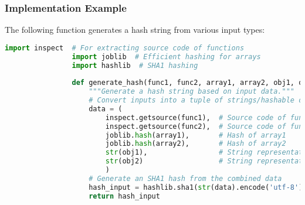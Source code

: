\documentclass{article}
\begin{document}
			\begin{comment}
			
			\subsubsection{The Concept of Hashing Input Data}
			
			The goal is to create a hash that uniquely represents simulation inputs:
			\begin{itemize}
				\item \textbf{Functions:} Use their source code as part of the hash (noting limitations for closures and dynamically defined functions).
				\item \textbf{Arrays:} Use efficient hashing methods like \texttt{joblib.hash} to avoid lengthy string conversions.
				\item \textbf{Objects:} Use string representations via \texttt{str()}, sufficient for smaller objects.
			\end{itemize}
			The resulting hash string can be used to:
			\begin{itemize}
				\item Name files or directories for storing simulation results.
				\item Check whether a previously computed result exists.
			\end{itemize}
				content...
			\end{comment}
			
			\subsubsection{Implementation Example}
			
			The following function generates a hash string from various input types:
			
			\begin{lstlisting}[language=Python]
				import inspect  # For extracting source code of functions
				import joblib  # Efficient hashing for arrays
				import hashlib  # SHA1 hashing
				
				def generate_hash(func1, func2, array1, array2, obj1, obj2):
					"""Generate a hash string based on input data."""
					# Convert inputs into a tuple of strings/hashable data
					data = (
						inspect.getsource(func1),  # Source code of func1
						inspect.getsource(func2),  # Source code of func2
						joblib.hash(array1),       # Hash of array1
						joblib.hash(array2),       # Hash of array2
						str(obj1),                 # String representation of obj1
						str(obj2)                  # String representation of obj2
						)
					# Generate an SHA1 hash from the combined data
					hash_input = hashlib.sha1(str(data).encode('utf-8')).hexdigest()
					return hash_input
			\end{lstlisting}
			
\end{document}
